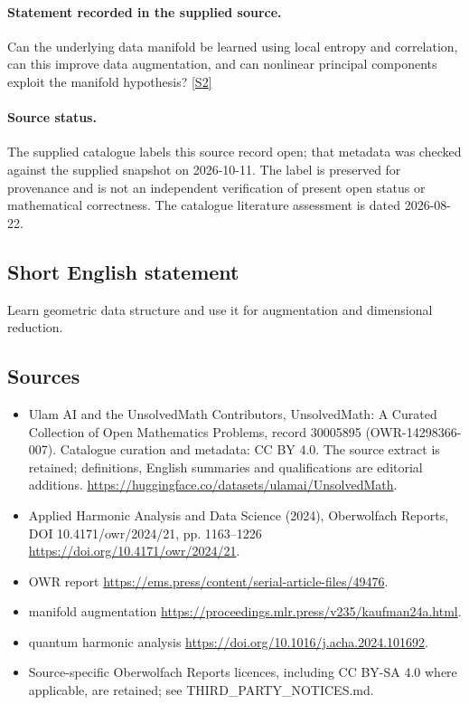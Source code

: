 \documentclass[11pt]{article}
\begin{document}
\paragraph{Statement recorded in the supplied source.}
Can the underlying data manifold be learned using local entropy and correlation, can this improve data augmentation, and can nonlinear principal components exploit the manifold hypothesis? \href{https://doi.org/10.4171/owr/2024/21}{[S2]}
\paragraph{Source status.}
The supplied catalogue labels this source record open; that metadata was checked against the supplied snapshot on 2026-10-11. The label is preserved for provenance and is not an independent verification of present open status or mathematical correctness. The catalogue literature assessment is dated 2026-08-22.
\subsection{Short English statement}
Learn geometric data structure and use it for augmentation and dimensional reduction.
\subsection{Sources}
\begin{itemize}
\item[S1] Ulam AI and the UnsolvedMath Contributors, UnsolvedMath: A Curated Collection of Open Mathematics Problems, record 30005895 (OWR-14298366-007). Catalogue curation and metadata: CC BY 4.0. The source extract is retained; definitions, English summaries and qualifications are editorial additions.
\url{https://huggingface.co/datasets/ulamai/UnsolvedMath}.
\item[S2] Applied Harmonic Analysis and Data Science (2024), Oberwolfach Reports, DOI 10.4171/owr/2024/21, pp. 1163--1226
\url{https://doi.org/10.4171/owr/2024/21}.
\item[S3] OWR report
\url{https://ems.press/content/serial-article-files/49476}.
\item[S4] manifold augmentation
\url{https://proceedings.mlr.press/v235/kaufman24a.html}.
\item[S5] quantum harmonic analysis
\url{https://doi.org/10.1016/j.acha.2024.101692}.
\item Source-specific Oberwolfach Reports licences, including CC BY-SA 4.0 where applicable, are retained; see THIRD\_PARTY\_NOTICES.md.
\end{itemize}
\end{document}
